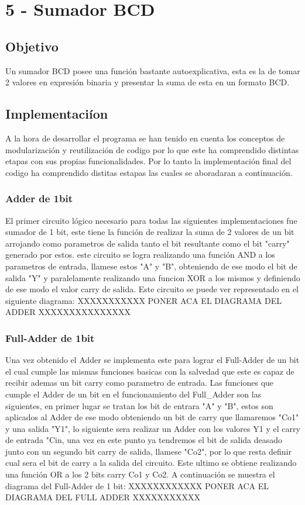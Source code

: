 \chapter*{5 - Sumador BCD}
\section{Objetivo}
  Un sumador BCD posee una funci\'on bastante autoexplicativa, esta es la de tomar 2 valores en expresi\'on binaria y presentar la suma de esta en un formato BCD.
  \section{Implementaci\'ion}
  A la hora de desarrollar el programa se han tenido en cuenta los conceptos de modularizaci\'on y reutilizaci\'on de codigo por lo que este ha comprendido distintas etapas con sus propias funcionalidades. Por lo tanto la implementaci\'on final del codigo ha comprendido distitas estapas las cuales se aboradaran a continuaci\'on.
  \subsection{Adder de 1bit}
  El primer circuito l\'ogico necesario para todas las siguientes implementaciones fue sumador de 1 bit, este tiene la funci\'on de realizar la suma de 2 valores de un bit arrojando como parametros de salida tanto el bit resultante como el bit "carry" generado por estos. este circuito se logra realizando una funci\'on AND a los parametros de entrada, llamese estos "A" y "B", obteniendo de ese modo el bit de salida "Y" y paralelamente realizando una funcion XOR a los mismos y definiendo de ese modo el valor carry de salida. Este circuito se puede ver representado en el siguiente diagrama:
  XXXXXXXXXXX PONER ACA EL DIAGRAMA DEL ADDER XXXXXXXXXXXXXXX
  \subsection{Full-Adder de 1bit}
 Una vez obtenido el Adder se implementa este para lograr el Full-Adder de un bit el cual cumple las mismas funciones basicas con la salvedad que este es capaz de recibir ademas un bit carry como parametro de entrada. Las funciones que cumple el Adder de un bit en el funcionamiento del Full_Adder son las siguientes, en primer lugar se tratan los bit de entrara "A" y "B", estos son aplicados al Adder de ese modo obteniendo un bit de carry que llamaremos "Co1" y una salida "Y1", lo siguiente sera realizar un Adder con los valores Y1 y el carry de entrada "Cin, una vez en este punto ya tendremos el bit de salida deasado junto con un segundo bit carry de salida, llamese "Co2", por lo que resta definir cual sera el bit de carry a la salida del circuito. Este ultimo se obtiene realizando una función OR a los 2 bits carry Co1 y Co2. A continuación se muestra el diagrama del Full-Adder de 1 bit:
  XXXXXXXXXXXX PONER ACA EL DIAGRAMA DEL FULL ADDER XXXXXXXXXXX
